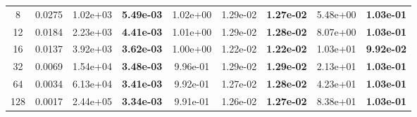 \documentclass{elsarticle}
\begin{document}
\begin{table}[htbp]
{\begin{tabular}{cc|cc|ccc|cc}
            8   & 0.0275     & 1.02e+03                     & \textbf{5.49e-03}         & 1.02e+00                              & 1.29e-02                  & \textbf{1.27e-02}                  & 5.48e+00                  & \textbf{1.03e-01}                  \\
            12  & 0.0184     & 2.23e+03                     & \textbf{4.41e-03}         & 1.01e+00                              & 1.29e-02                  & \textbf{1.28e-02}                  & 8.07e+00                  & \textbf{1.03e-01}                  \\
            16  & 0.0137     & 3.92e+03                     & \textbf{3.62e-03}         & 1.00e+00                              & 1.22e-02                  & \textbf{1.22e-02}                  & 1.03e+01                  & \textbf{9.92e-02}                  \\
            32  & 0.0069     & 1.54e+04                     & \textbf{3.48e-03}         & 9.96e-01                              & 1.29e-02                  & \textbf{1.29e-02}                  & 2.13e+01                  & \textbf{1.03e-01}                  \\
            64  & 0.0034     & 6.13e+04                     & \textbf{3.41e-03}         & 9.92e-01                              & 1.27e-02                  & \textbf{1.28e-02}                  & 4.23e+01                  & \textbf{1.03e-01}                  \\
            128 & 0.0017     & 2.44e+05                     & \textbf{3.34e-03}         & 9.91e-01                              & 1.26e-02                  & \textbf{1.27e-02}                  & 8.38e+01                  & \textbf{1.03e-01}                  \\
            \bottomrule
        \end{tabular}
    }
\end{table}
\end{document}
